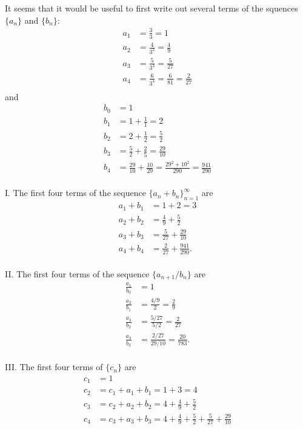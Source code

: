 \documentclass[]{ximera}
\begin{document}
\begin{freeResponse}
It seems that it would be useful to first write out several terms of the squences $\{a_n\}$ and $\{b_n\}$:
\begin{align*}
a_1 &= \frac{3}{3} = 1 \\
a_2 &= \frac{4}{3^2} = \frac{4}{9} \\
a_3 &= \frac{5}{3^3} = \frac{5}{27} \\
a_4 &= \frac{6}{3^4} = \frac{6}{81} = \frac{2}{27}\\
\end{align*}
and 
\begin{align*}
b_0 &= 1\\
b_1 &= 1 + \frac{1}{1} = 2\\
b_2 &= 2 + \frac{1}{2} = \frac{5}{2}\\
b_3 &= \frac{5}{2} + \frac{2}{5} = \frac{29}{10} \\
b_4 &= \frac{29}{10} + \frac{10}{29} = \frac{29^2 + 10^2}{290} = \frac{941}{290}\\
\end{align*}

I. The first four terms of the sequence $\{a_n + b_n\}_{n=1}^\infty$ are 
\begin{align*}
a_1 + b_1 &= 1 + 2 = 3\\
a_2 + b_2 &= \frac{4}{9} + \frac{5}{2}\\
a_3 + b_3 &= \frac{5}{27} + \frac{29}{10} \\
a_4 + b_4 &= \frac{2}{27} + \frac{941}{290}.\\
\end{align*}

II. The first four terms of the sequence $\{a_{n+1}/b_n\}$ are 
\begin{align*}
\frac{a_1}{b_0} &= 1 \\
\frac{a_2}{b_1} &= \frac{4/9}{2} = \frac{2}{9} \\
\frac{a_3}{b_2} &= \frac{5/27}{5/2} = \frac{2}{27}\\
\frac{a_4}{b_3} &= \frac{2/27}{29/10} = \frac{20}{783}.\\
\end{align*}

III. The first four terms of $\{c_n\}$ are 
\begin{align*}
c_1 &= 1 \\
c_2 &= c_1 + a_1 + b_1 = 1 + 3 = 4 \\
c_3 &= c_2 + a_2 + b_2 = 4 + \frac{4}{9} + \frac{5}{2} \\
c_4 &= c_3 + a_3 + b_3 =  4 + \frac{4}{9} + \frac{5}{2} + \frac{5}{27} + \frac{29}{10}\\
\end{align*}
\end{freeResponse}
\end{document}

